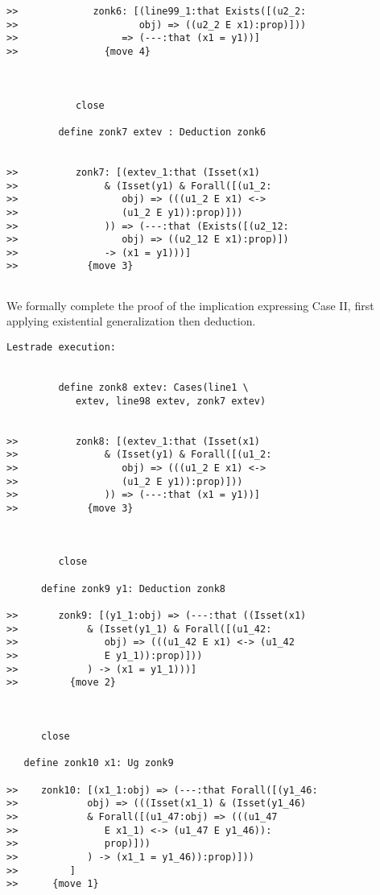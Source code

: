 \documentclass{article}
\begin{document}
{\begin{verbatim}
>>             zonk6: [(line99_1:that Exists([(u2_2:
>>                     obj) => ((u2_2 E x1):prop)]))
>>                  => (---:that (x1 = y1))]
>>               {move 4}



            close

         define zonk7 extev : Deduction zonk6


>>          zonk7: [(extev_1:that (Isset(x1)
>>               & (Isset(y1) & Forall([(u1_2:
>>                  obj) => (((u1_2 E x1) <->
>>                  (u1_2 E y1)):prop)]))
>>               )) => (---:that (Exists([(u2_12:
>>                  obj) => ((u2_12 E x1):prop)])
>>               -> (x1 = y1)))]
>>            {move 3}


\end{verbatim}

We formally complete the proof of the implication expressing Case II, first applying existential generalization then deduction.


\begin{verbatim}Lestrade execution:


         define zonk8 extev: Cases(line1 \
            extev, line98 extev, zonk7 extev)


>>          zonk8: [(extev_1:that (Isset(x1)
>>               & (Isset(y1) & Forall([(u1_2:
>>                  obj) => (((u1_2 E x1) <->
>>                  (u1_2 E y1)):prop)]))
>>               )) => (---:that (x1 = y1))]
>>            {move 3}



         close

      define zonk9 y1: Deduction zonk8

>>       zonk9: [(y1_1:obj) => (---:that ((Isset(x1)
>>            & (Isset(y1_1) & Forall([(u1_42:
>>               obj) => (((u1_42 E x1) <-> (u1_42
>>               E y1_1)):prop)]))
>>            ) -> (x1 = y1_1)))]
>>         {move 2}



      close

   define zonk10 x1: Ug zonk9

>>    zonk10: [(x1_1:obj) => (---:that Forall([(y1_46:
>>            obj) => (((Isset(x1_1) & (Isset(y1_46)
>>            & Forall([(u1_47:obj) => (((u1_47
>>               E x1_1) <-> (u1_47 E y1_46)):
>>               prop)]))
>>            ) -> (x1_1 = y1_46)):prop)]))
>>         ]
>>      {move 1}




\end{verbatim}}
\end{document}
